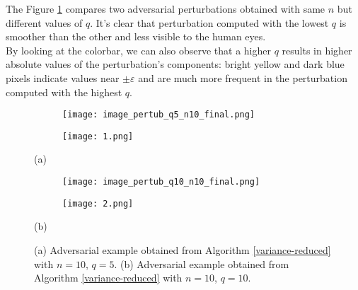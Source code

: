 The Figure \ref{fig:vred} compares two adversarial perturbations obtained with same $n$ but different values of $q$. It's clear that perturbation computed with the lowest $q$ is smoother than the other and less visible to the human eyes.\\
\indent By looking at the colorbar, we can also observe that a higher $q$ results in higher absolute values of the perturbation's components: bright yellow and dark blue pixels indicate values near $\pm\varepsilon$ and are much more frequent in the perturbation computed with the highest $q$.

\begin{figure}[h]
	\begin{subfigure}[b]{0.15\textwidth}
		\texttt{[image: image\_pertub\_q5\_n10\_final.png]}
	\end{subfigure}
	\hspace{2.5cm}
	\begin{subfigure}[b]{0.15\textwidth}
		\texttt{[image: 1.png]}
	\end{subfigure}
	\newline
	\centerline{(a)}
	\begin{subfigure}[b]{0.15\textwidth}
		\texttt{[image: image\_pertub\_q10\_n10\_final.png]}
	\end{subfigure}
	\hspace{2.5cm}
	\begin{subfigure}[b]{0.15\textwidth}
		\texttt{[image: 2.png]}
	\end{subfigure}
	\newline
	\centerline{(b)}
	\caption{{\small (a) Adversarial example obtained from Algorithm \ref{variance-reduced} with $n=10$, $q=5$. (b) Adversarial example obtained from Algorithm \ref{variance-reduced} with $n=10$, $q=10$.}  }
	\label{fig:vred}
\end{figure}
